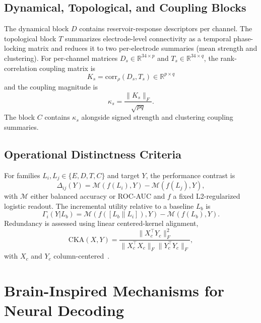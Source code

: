 \documentclass[journal]{IEEEtran}
\begin{document}
\subsection{Dynamical, Topological, and Coupling Blocks}
The dynamical block $D$ contains reservoir-response descriptors per channel. The topological block $T$ summarizes electrode-level connectivity as a temporal phase-locking matrix and reduces it to two per-electrode summaries (mean strength and clustering). For per-channel matrices $D_s\in\mathbb{R}^{34\times p}$ and $T_s\in\mathbb{R}^{34\times q}$, the rank-correlation coupling matrix is
\begin{equation}
K_s = \mathrm{corr}_{\rho}(D_s,T_s) \in \mathbb{R}^{p\times q}
\end{equation}
and the coupling magnitude is
\begin{equation}
\kappa_s = \frac{\|K_s\|_F}{\sqrt{pq}}.
\label{eq:kappa}
\end{equation}
The block $C$ contains $\kappa_s$ alongside signed strength and clustering coupling summaries.

\subsection{Operational Distinctness Criteria}
For families $L_i,L_j\in\{E,D,T,C\}$ and target $Y$, the performance contrast is
\begin{equation}
\Delta_{ij}(Y)=\mathcal{M}(f(L_i),Y)-\mathcal{M}(f(L_j),Y),
\label{eq:contrast}
\end{equation}
with $\mathcal{M}$ either balanced accuracy or ROC-AUC and $f$ a fixed L2-regularized logistic readout. The incremental utility relative to a baseline $L_b$ is
\begin{equation}
\Gamma_i(Y|L_b)=\mathcal{M}(f([L_b\|L_i]),Y)-\mathcal{M}(f(L_b),Y).
\label{eq:increment}
\end{equation}
Redundancy is assessed using linear centered-kernel alignment,
\begin{equation}
\mathrm{CKA}(X,Y)=\frac{\|X_c^{\top}Y_c\|_F^2}{\|X_c^{\top}X_c\|_F\|Y_c^{\top}Y_c\|_F},
\label{eq:cka}
\end{equation}
with $X_c$ and $Y_c$ column-centered~\cite{kornblith2019similarity}.

\section{Brain-Inspired Mechanisms for Neural Decoding}\label{sec:mechanisms}
\end{document}
